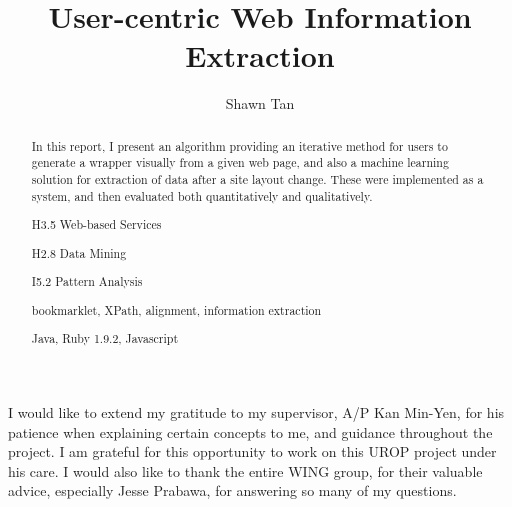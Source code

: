 \documentclass[urop]{socreport}
\begin{document}
\title{User-centric Web Information Extraction}
\author{Shawn Tan}
\maketitle
\begin{abstract}
In this report, I present an algorithm providing an iterative method for users to generate a 
wrapper visually from a given web page, and also a machine learning solution for extraction of
data after a site layout change. These were implemented as a system, and then evaluated 
both quantitatively and qualitatively. 

\begin{descriptors}
	\item H3.5 Web-based Services
    \item H2.8 Data Mining
	\item I5.2 Pattern Analysis
\end{descriptors}
\begin{keywords}
	bookmarklet,  XPath, alignment, information extraction
\end{keywords}
\begin{implement}
	Java, Ruby 1.9.2, Javascript
\end{implement}
\end{abstract}

\begin{acknowledgement}
	I would like to extend my gratitude to my supervisor, A/P Kan Min-Yen, for his patience
when explaining certain concepts to me, and guidance throughout the project. I am grateful
for this opportunity to work on this UROP project under his care. I would also like to thank
the entire WING group, for their valuable advice, especially Jesse Prabawa, for answering 
so many of my questions. 
\end{acknowledgement}

\listoffigures 
\listoftables
\tableofcontents 











\newpage
\appendix

\end{document}
